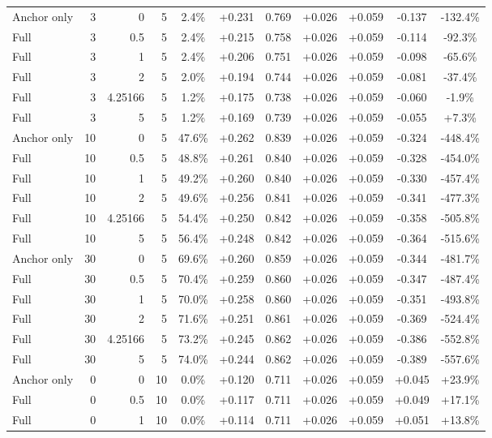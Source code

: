 \begin{table}[htbp]
\begin{tabular}{lrrrccccccc}
Anchor only & 3 & 0 & 5 & 2.4\% & +0.231 & 0.769 & +0.026 & +0.059 & -0.137 & -132.4\% \\
Full & 3 & 0.5 & 5 & 2.4\% & +0.215 & 0.758 & +0.026 & +0.059 & -0.114 & -92.3\% \\
Full & 3 & 1 & 5 & 2.4\% & +0.206 & 0.751 & +0.026 & +0.059 & -0.098 & -65.6\% \\
Full & 3 & 2 & 5 & 2.0\% & +0.194 & 0.744 & +0.026 & +0.059 & -0.081 & -37.4\% \\
Full & 3 & 4.25166 & 5 & 1.2\% & +0.175 & 0.738 & +0.026 & +0.059 & -0.060 & -1.9\% \\
Full & 3 & 5 & 5 & 1.2\% & +0.169 & 0.739 & +0.026 & +0.059 & -0.055 & +7.3\% \\
Anchor only & 10 & 0 & 5 & 47.6\% & +0.262 & 0.839 & +0.026 & +0.059 & -0.324 & -448.4\% \\
Full & 10 & 0.5 & 5 & 48.8\% & +0.261 & 0.840 & +0.026 & +0.059 & -0.328 & -454.0\% \\
Full & 10 & 1 & 5 & 49.2\% & +0.260 & 0.840 & +0.026 & +0.059 & -0.330 & -457.4\% \\
Full & 10 & 2 & 5 & 49.6\% & +0.256 & 0.841 & +0.026 & +0.059 & -0.341 & -477.3\% \\
Full & 10 & 4.25166 & 5 & 54.4\% & +0.250 & 0.842 & +0.026 & +0.059 & -0.358 & -505.8\% \\
Full & 10 & 5 & 5 & 56.4\% & +0.248 & 0.842 & +0.026 & +0.059 & -0.364 & -515.6\% \\
Anchor only & 30 & 0 & 5 & 69.6\% & +0.260 & 0.859 & +0.026 & +0.059 & -0.344 & -481.7\% \\
Full & 30 & 0.5 & 5 & 70.4\% & +0.259 & 0.860 & +0.026 & +0.059 & -0.347 & -487.4\% \\
Full & 30 & 1 & 5 & 70.0\% & +0.258 & 0.860 & +0.026 & +0.059 & -0.351 & -493.8\% \\
Full & 30 & 2 & 5 & 71.6\% & +0.251 & 0.861 & +0.026 & +0.059 & -0.369 & -524.4\% \\
Full & 30 & 4.25166 & 5 & 73.2\% & +0.245 & 0.862 & +0.026 & +0.059 & -0.386 & -552.8\% \\
Full & 30 & 5 & 5 & 74.0\% & +0.244 & 0.862 & +0.026 & +0.059 & -0.389 & -557.6\% \\
Anchor only & 0 & 0 & 10 & 0.0\% & +0.120 & 0.711 & +0.026 & +0.059 & +0.045 & +23.9\% \\
Full & 0 & 0.5 & 10 & 0.0\% & +0.117 & 0.711 & +0.026 & +0.059 & +0.049 & +17.1\% \\
Full & 0 & 1 & 10 & 0.0\% & +0.114 & 0.711 & +0.026 & +0.059 & +0.051 & +13.8\% \\

\end{tabular}
\end{table}
